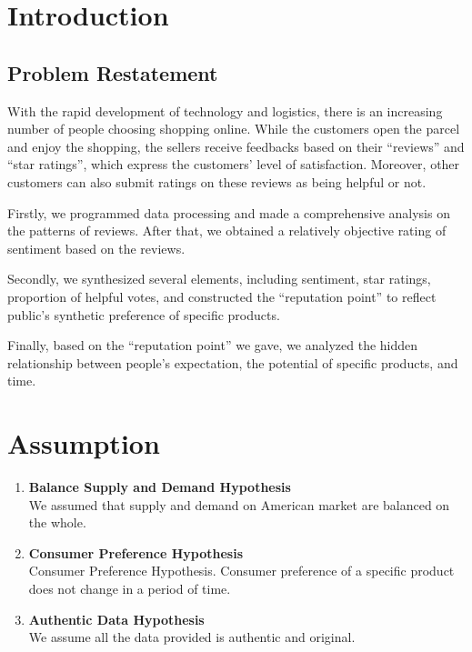 \documentclass{mcmthesis}
\begin{document}
\newpage

\section{Introduction}

\subsection{Problem Restatement}

With the rapid development of technology and logistics, there is an increasing number of people choosing shopping online. While the customers open the parcel and enjoy the shopping, the sellers receive feedbacks based on their “reviews” and “star ratings”, which express the customers’ level of satisfaction. Moreover, other customers can also submit ratings on these reviews as being helpful or not.

Firstly, we programmed data processing and made a comprehensive analysis on the patterns of reviews. After that, we obtained a relatively objective rating of sentiment based on the reviews.

Secondly, we synthesized several elements, including sentiment, star ratings, proportion of helpful votes, and constructed the “reputation point” to reflect public’s synthetic preference of specific products.

Finally, based on the “reputation point” we gave, we analyzed the hidden relationship between people’s expectation, the potential of specific products, and time. 




\section{Assumption}

\begin{enumerate}
  \item \textbf{Balance Supply and Demand Hypothesis}\\
  We assumed that supply and demand on American market are balanced on the whole. 
  \item \textbf{Consumer Preference Hypothesis} \\
  Consumer Preference Hypothesis. Consumer preference of a specific product does not change in a period of time.
  \item \textbf{Authentic Data Hypothesis} \\
  We assume all the data provided is authentic and original. 
\end{enumerate}
\end{document}

